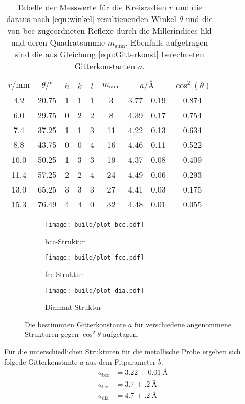 \begin{table}
\centering
\caption{Tabelle der Messwerte für die Kreisradien $r$ und die daraus nach \ref{eqn:winkel} resultienenden Winkel $\theta$
    und die von bcc zugeordneten Reflexe durch die Millerindices hkl und deren Quadratsumme $m_\mathrm{sum}$.
    Ebenfalls aufgetragen sind die
    aus Gleichung \eqref{eqn:Gitterkonst} berechneten Gitterkonstanten $a$.}
  \label{tab:dia}
\begin{tabular}{S S c c c c S[table-format=1.2]@{${}\pm{}$} S[table-format=1.2] S[table-format=1.3]  }
\toprule
$r/\si{\milli\meter}$ & $\theta / \si{\degree}$ &$h$ & $k$ & $l$ & $m_\mathrm{sum}$ & 
&  {$\cos^2\left(\theta\right)$} \\
 	&	20.75	&	1	&	1	&	1	&	3	  &	3.77	&	0.19	&	0.874   \\
6.0 	&	29.75	&	0	&	2	&	2	&	8  	&	4.39  &	0.17	&	0.754   \\
7.4 	&	37.25	&	1	&	1	&	3	&	11	&	4.22  &	0.13 	&	0.634   \\
8.8 	&	43.75	&	0	&	0	&	4	&	16  &	4.46  &	0.11	&	0.522   \\
10.0	&	50.25	&	1	&	3	&	3	&	19	&	4.37	&	0.08	&	0.409   \\
11.4	&	57.25	&	2	&	2	&	4	&	24	&	4.49	&	0.06	&	0.293   \\
13.0	&	65.25	&	3	&	3	&	3	&	27	&	4.41	&	0.03	&	0.175   \\
15.3	&	76.49	&	4	&	4	&	0	&	32	&	4.48	&	0.01	&	0.055   \\
\bottomrule
\end{tabular}
\end{table}


\begin{figure}[hhh]
  \centering
  \begin{subfigure}{0.95\textwidth}
    \centering
    \texttt{[image: build/plot\_bcc.pdf]}
    \caption{bcc-Struktur}
    \label{subfig:bcc}
  \end{subfigure}
  \begin{subfigure}{.49\textwidth}
    \centering
    \texttt{[image: build/plot\_fcc.pdf]}
    \caption{fcc-Struktur}
    \label{subfig:fcc}
  \end{subfigure}
  \begin{subfigure}{.49\textwidth}
    \centering
    \texttt{[image: build/plot\_dia.pdf]}
    \caption{Diamant-Struktur}
    \label{subfig:dia}
  \end{subfigure}
  \caption{Die bestimmten Gitterkonstante $a$ für verschiedene angenommene Strukturen gegen $\cos^2\theta$ aufgetagen.}
  \label{fig:metall}
\end{figure}
\FloatBarrier
Für die unterschiedlichen Strukturen für die metallische Probe ergeben sich folgede Gitterkonstante $a$
aus dem Fitparameter $b$:
\begin{align*}
a_\mathrm{bcc}&=\SI{3.22(1)}{\angstrom}\\
a_\mathrm{fcc}&=\SI{3.7(2)}{\angstrom}\\
a_\mathrm{dia}&=\SI{4.7(2)}{\angstrom}
\end{align*}



